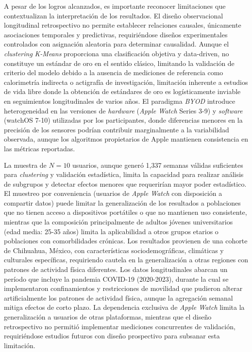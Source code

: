 A pesar de los logros alcanzados, es importante reconocer limitaciones que contextualizan la interpretación de los resultados. El diseño observacional longitudinal retrospectivo no permite establecer relaciones causales, únicamente asociaciones temporales y predictivas, requiriéndose diseños experimentales controlados con asignación aleatoria para determinar causalidad. Aunque el \textit{clustering} \textit{K-Means} proporciona una clasificación objetiva y data-driven, no constituye un estándar de oro en el sentido clásico, limitando la validación de criterio del modelo debido a la ausencia de mediciones de referencia como calorimetría indirecta o actigrafía de investigación, limitación inherente a estudios de vida libre donde la obtención de estándares de oro es logísticamente inviable en seguimientos longitudinales de varios años. El paradigma \textit{BYOD} introduce heterogeneidad en las versiones de \textit{hardware} (\textit{Apple Watch} Series 3-9) y \textit{software} (watchOS 7-10) utilizadas por los participantes, donde diferencias menores en la precisión de los sensores podrían contribuir marginalmente a la variabilidad observada, aunque los algoritmos propietarios de Apple mantienen consistencia en las métricas reportadas.

La muestra de $N=10$ usuarios, aunque generó 1,337 semanas válidas suficientes para \textit{clustering} y validación estadística, limita la capacidad para realizar análisis de subgrupos y detectar efectos menores que requerirían mayor poder estadístico. El muestreo por conveniencia (usuarios de \textit{Apple Watch} con disposición a compartir datos) puede limitar la generalización de los resultados a poblaciones que no tienen acceso a dispositivos portátiles o que no mantienen uso consistente, mientras que la composición principalmente de adultos jóvenes universitarios (edad media: 25-35 años) limita la aplicabilidad a otros grupos etarios o poblaciones con comorbilidades crónicas. Los resultados provienen de una cohorte de Chihuahua, México, con características sociodemográficas, climáticas y culturales específicas, requiriendo cautela en la generalización a otras regiones con patrones de actividad física diferentes. Los datos longitudinales abarcan un período que incluye la pandemia COVID-19 (2020-2023), durante la cual se implementaron confinamientos y restricciones de movilidad que pudieron alterar artificialmente los patrones de actividad física, aunque la agregación semanal mitiga efectos de corto plazo. La dependencia exclusiva de \textit{Apple Watch} limita la generalización a usuarios de otras plataformas, mientras que el diseño retrospectivo no permitió implementar mediciones concurrentes de validación, requiriéndose estudios futuros con diseño prospectivo para subsanar esta limitación.

